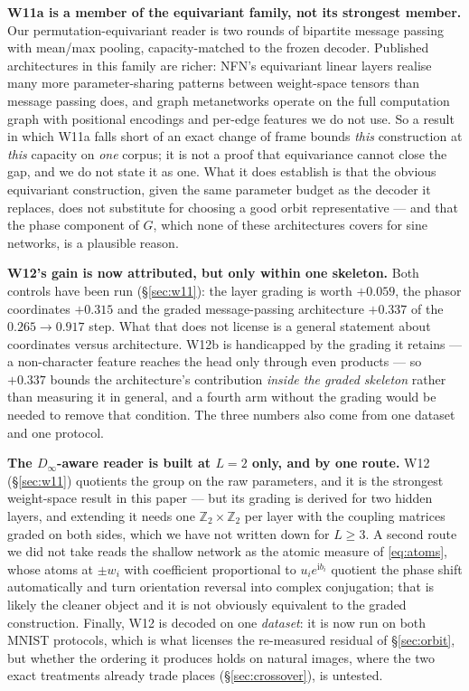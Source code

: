 \documentclass[10pt,letterpaper]{article}
\theoremstyle{definition}
\newcommand{\Z}{\mathbb{Z}}
\newcommand{\Dinf}{D_\infty}
\begin{document}
\textbf{W11a is a member of the equivariant family, not its strongest member.} Our
permutation-equivariant reader is two rounds of bipartite message passing with mean/max pooling,
capacity-matched to the frozen decoder. Published architectures in this family are richer: NFN's
equivariant linear layers realise many more parameter-sharing patterns between weight-space
tensors than message passing does, and graph metanetworks operate on the full computation graph
with positional encodings and per-edge features we do not use. So a result in which W11a falls
short of an exact change of frame bounds \emph{this} construction at \emph{this} capacity on
\emph{one} corpus; it is not a proof that equivariance cannot close the gap, and we do not state it
as one. What it does establish is that the obvious equivariant construction, given the same
parameter budget as the decoder it replaces, does not substitute for choosing a good orbit
representative --- and that the phase component of $G$, which none of these architectures covers
for sine networks, is a plausible reason.

\textbf{W12's gain is now attributed, but only within one skeleton.} Both controls have been run
(\S\ref{sec:w11}): the layer grading is worth $+0.059$, the phasor coordinates $+0.315$ and the
graded message-passing architecture $+0.337$ of the $0.265 \to 0.917$ step. What that does not
license is a general statement about coordinates versus architecture. W12b is handicapped by the
grading it retains --- a non-character feature reaches the head only through even products --- so
$+0.337$ bounds the architecture's contribution \emph{inside the graded skeleton} rather than
measuring it in general, and a fourth arm without the grading would be needed to remove that
condition. The three numbers also come from one dataset and one protocol.

\textbf{The $\Dinf$-aware reader is built at $L=2$ only, and by one route.} W12
(\S\ref{sec:w11}) quotients the group on the raw parameters, and it is the strongest weight-space
result in this paper --- but its grading is derived for two hidden layers, and extending it needs
one $\Z_2\times\Z_2$ per layer with the coupling matrices graded on both sides, which we have not
written down for $L\ge3$. A second route we did not take reads the shallow network as the atomic
measure of \eqref{eq:atoms}, whose atoms at $\pm w_i$ with coefficient proportional to
$u_i e^{\mathrm i b_i}$ quotient the phase shift automatically and turn orientation reversal into
complex conjugation; that is likely the cleaner object and it is not obviously equivalent to the
graded construction. Finally, W12 is decoded on one \emph{dataset}: it is now run on both MNIST
protocols, which is what licenses the re-measured residual of \S\ref{sec:orbit}, but whether the
ordering it produces holds on natural images, where the two exact treatments already trade places
(\S\ref{sec:crossover}), is untested.
\end{document}

